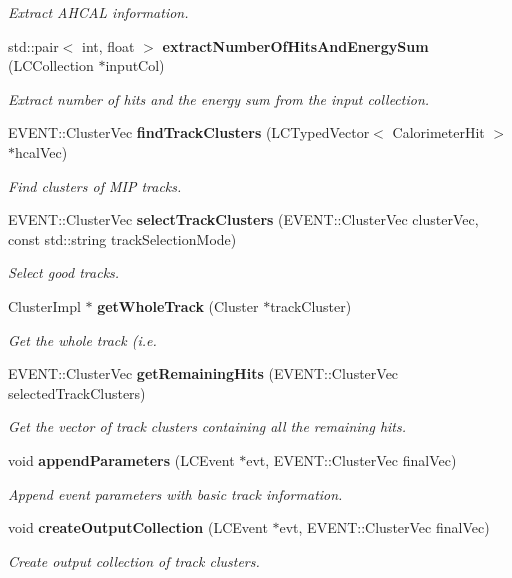 \begin{DoxyCompactItemize}
\begin{DoxyCompactList}\small\item\em Extract A\-H\-C\-A\-L information. \end{DoxyCompactList}\item 
std\-::pair$<$ int, float $>$ {\bf extract\-Number\-Of\-Hits\-And\-Energy\-Sum} (L\-C\-Collection $\ast$input\-Col)
\begin{DoxyCompactList}\small\item\em Extract number of hits and the energy sum from the input collection. \end{DoxyCompactList}\item 
E\-V\-E\-N\-T\-::\-Cluster\-Vec {\bf find\-Track\-Clusters} (L\-C\-Typed\-Vector$<$ Calorimeter\-Hit $>$ $\ast$hcal\-Vec)
\begin{DoxyCompactList}\small\item\em Find clusters of M\-I\-P tracks. \end{DoxyCompactList}\item 
E\-V\-E\-N\-T\-::\-Cluster\-Vec {\bf select\-Track\-Clusters} (E\-V\-E\-N\-T\-::\-Cluster\-Vec cluster\-Vec, const std\-::string track\-Selection\-Mode)
\begin{DoxyCompactList}\small\item\em Select good tracks. \end{DoxyCompactList}\item 
Cluster\-Impl $\ast$ {\bf get\-Whole\-Track} (Cluster $\ast$track\-Cluster)
\begin{DoxyCompactList}\small\item\em Get the whole track (i.\-e. \end{DoxyCompactList}\item 
E\-V\-E\-N\-T\-::\-Cluster\-Vec {\bf get\-Remaining\-Hits} (E\-V\-E\-N\-T\-::\-Cluster\-Vec selected\-Track\-Clusters)
\begin{DoxyCompactList}\small\item\em Get the vector of track clusters containing all the remaining hits. \end{DoxyCompactList}\item 
void {\bf append\-Parameters} (L\-C\-Event $\ast$evt, E\-V\-E\-N\-T\-::\-Cluster\-Vec final\-Vec)
\begin{DoxyCompactList}\small\item\em Append event parameters with basic track information. \end{DoxyCompactList}\item 
void {\bf create\-Output\-Collection} (L\-C\-Event $\ast$evt, E\-V\-E\-N\-T\-::\-Cluster\-Vec final\-Vec)
\begin{DoxyCompactList}\small\item\em Create output collection of track clusters. \end{DoxyCompactList}\end{DoxyCompactItemize}
